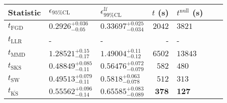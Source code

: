 \begin{tabular}{l|llr|llr}
	Statistic & $\epsilon_{95\%\mathrm{CL}}$ & $\epsilon^    {\mathcal{U}}_{99\%\mathrm{CL}}$ & $t$ (s) & $t^{\mathrm{null}}$ (s) \\
	\midrule
	$t_{\mathrm{FGD}}$ & ${\mathbf{0.2926_{-0.05}^{+0.036}}}$ & ${\mathbf{0.33697_{-0.034}^{+0.025}}}$ & $2042$ & $3821$ \\
	$t_{\mathrm{LLR}}$ & - & - & - & - \\
	$t_{\mathrm{MMD}}$ & $1.28521_{-0.17}^{+0.15}$ & $1.49004_{-0.12}^{+0.11}$ & $6502$ & $13843$ \\
	$t_{\mathrm{SKS}}$ & $0.48849_{-0.11}^{+0.085}$ & $0.56476_{-0.079}^{+0.072}$ & $582$ & $480$ \\
	$t_{\mathrm{SW}}$ & $0.49513_{-0.11}^{+0.079}$ & $0.5818_{-0.078}^{+0.063}$ & $512$ & $313$ \\
	$t_{\overline{\mathrm{KS}}}$ & $0.55562_{-0.14}^{+0.096}$ & $0.65585_{-0.089}^{+0.083}$ & ${\mathbf{378}}$ & ${\mathbf{127}}$ \\
	\bottomrule
\end{tabular}